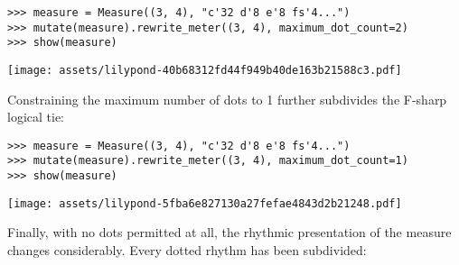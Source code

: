 \begin{comment}
<abjad>
measure = Measure((3, 4), "c'32 d'8 e'8 fs'4...")
mutate(measure).rewrite_meter((3, 4), maximum_dot_count=2)
show(measure)
</abjad>
\end{comment}

\begin{abjadbookoutput}
\begin{singlespacing}
\vspace{-0.5\baselineskip}
\begin{verbatim}
>>> measure = Measure((3, 4), "c'32 d'8 e'8 fs'4...")
>>> mutate(measure).rewrite_meter((3, 4), maximum_dot_count=2)
>>> show(measure)
\end{verbatim}
\noindent\texttt{[image: assets/lilypond-40b68312fd44f949b40de163b21588c3.pdf]}
\end{singlespacing}
\end{abjadbookoutput}

\noindent Constraining the maximum number of dots to 1 further subdivides the
F-sharp logical tie:

\begin{comment}
<abjad>
measure = Measure((3, 4), "c'32 d'8 e'8 fs'4...")
mutate(measure).rewrite_meter((3, 4), maximum_dot_count=1)
show(measure)
</abjad>
\end{comment}

\begin{abjadbookoutput}
\begin{singlespacing}
\vspace{-0.5\baselineskip}
\begin{verbatim}
>>> measure = Measure((3, 4), "c'32 d'8 e'8 fs'4...")
>>> mutate(measure).rewrite_meter((3, 4), maximum_dot_count=1)
>>> show(measure)
\end{verbatim}
\noindent\texttt{[image: assets/lilypond-5fba6e827130a27fefae4843d2b21248.pdf]}
\end{singlespacing}
\end{abjadbookoutput}

\noindent Finally, with no dots permitted at all, the rhythmic presentation of
the measure changes considerably. Every dotted rhythm has been subdivided:

\begin{comment}
<abjad>
measure = Measure((3, 4), "c'32 d'8 e'8 fs'4...")
mutate(measure).rewrite_meter((3, 4), maximum_dot_count=0)
show(measure)
</abjad>
\end{comment}

